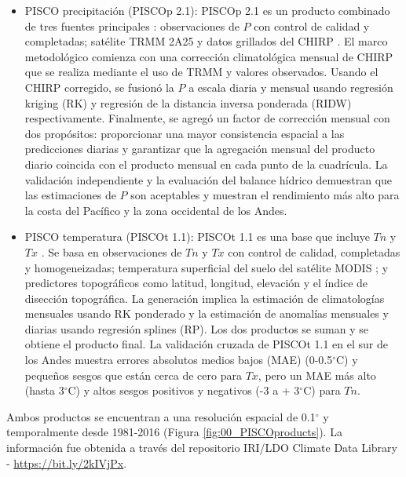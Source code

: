 \documentclass[12pt]{article}
\begin{document}
\begin{itemize}
	\item PISCO precipitación (PISCOp 2.1): PISCOp 2.1 es un producto combinado de tres fuentes principales \citep{Aybar2019}: observaciones de $P$ con control de calidad y completadas; satélite TRMM 2A25 \citep{iguchi2000rain} y datos grillados del CHIRP \citep{funk2015climate}. El marco metodológico comienza con una corrección climatológica mensual de CHIRP que se realiza mediante el uso de TRMM y valores observados. Usando el CHIRP corregido, se fusionó la $P$ a escala diaria y mensual usando regresión kriging (RK) y regresión de la distancia inversa ponderada (RIDW) respectivamente. Finalmente, se agregó un factor de corrección mensual con dos propósitos: proporcionar una mayor consistencia espacial a las predicciones diarias y garantizar que la agregación mensual del producto diario coincida con el producto mensual en cada punto de la cuadrícula. La validación independiente y la evaluación del balance hídrico demuestran que las estimaciones de $P$ son aceptables y muestran el rendimiento más alto para la costa del Pacífico y la zona occidental de los Andes.

\clearpage
	
	\item PISCO temperatura (PISCOt 1.1): PISCOt 1.1 es una base que incluye $Tn$ y $Tx$ \citep{Huerta2019}. Se basa en observaciones de $Tn$ y $Tx$ con control de calidad, completadas y homogeneizadas; temperatura superficial del suelo del satélite MODIS \citep{jin2010land}; y predictores topográficos como latitud, longitud, elevación y el índice de disección topográfica. La generación implica la estimación de climatologías mensuales usando RK ponderado y la estimación de anomalías mensuales y diarias usando regresión splines (RP). Los dos productos se suman y se obtiene el producto final. La validación cruzada de PISCOt 1.1 en el sur de los Andes muestra errores absolutos medios bajos (MAE) (0-0.5$^{\circ}$C) y pequeños sesgos que están cerca de cero para $Tx$, pero un MAE más alto (hasta 3$^{\circ}$C) y altos sesgos positivos y negativos (-3 a + 3$^{\circ}$C) para $Tn$.
	
\end{itemize}

Ambos productos se encuentran a una resolución espacial de 0.1$^{\circ}$ y temporalmente desde 1981-2016 (Figura \ref{fig:00_PISCOproducts}). La información fue obtenida a través del repositorio IRI/LDO Climate Data Library - \url{https://bit.ly/2kIVjPx}.
\end{document}
